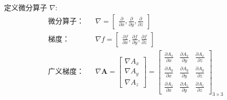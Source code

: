 \documentclass[UTF8]{report}
\theoremstyle{MyLineTheoremStyle} %
\theoremstyle{MyBlockTheoremStyle} %
\theoremstyle{MySubsubsectionStyle} %
\begin{document}
定义微分算子 $\nabla$: 
\begin{equation}
    \begin{aligned}
        &\text{微分算子：} 
        &&\nabla = 
        \begin{bmatrix}
            \frac{\partial  }{\partial x }, \frac{\partial  }{\partial y }, \frac{\partial  }{\partial z }
        \end{bmatrix}
        \\ 
        &\text{梯度：} &&\nabla f = 
        \begin{bmatrix}
            \frac{\partial f }{\partial x }, \frac{\partial f }{\partial y }, \frac{\partial f }{\partial z }
        \end{bmatrix}\\ 
        &\text{广义梯度：}
        &&\nabla \boldsymbol{A} = 
        \begin{bmatrix}
            \nabla A_x \\ \nabla A_y \\ \nabla A_z
        \end{bmatrix} = 
        \begin{bmatrix}
            \frac{\partial A_x }{\partial x } & \frac{\partial A_x }{\partial y } & \frac{\partial A_x }{\partial z } \\
            \frac{\partial A_y }{\partial x } & \frac{\partial A_y }{\partial y } & \frac{\partial A_y }{\partial z } \\
            \frac{\partial A_z }{\partial x } & \frac{\partial A_z }{\partial y } & \frac{\partial A_z }{\partial z }
        \end{bmatrix}_{3 \times 3}
    \end{aligned}    
\end{equation}
\end{document}
